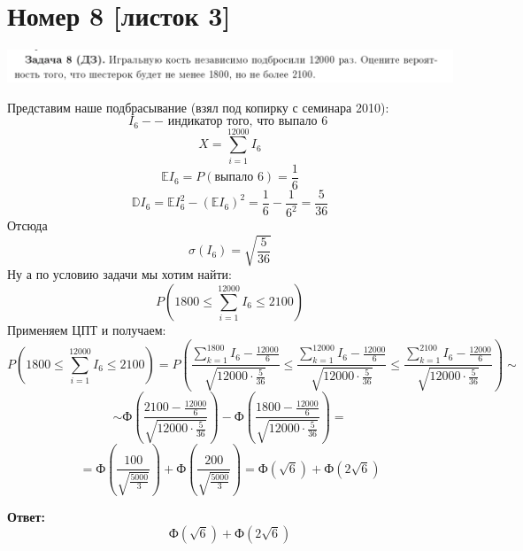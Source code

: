 \documentclass[a4paper,12pt]{article}
\begin{document}
\section*{Номер 8 [листок 3]}
\begin{center}
\includegraphics[scale=0.4]{3.png}
\end{center}
Представим наше подбрасывание (взял под копирку с семинара 2010):
\[
I_6 -- \text{ индикатор того, что выпало 6 }
\]
\[
X = \sum_{i = 1}^{12000} I_6
\]
\[
\mathbb{E}I_6 = P(\text{выпало 6}) = \frac{1}{6}
\]
\[ 
\mathbb{D}I_6 = \mathbb{E}I_6^2 - (\mathbb{E}I_6)^2 = \frac{1}{6} - \frac{1}{6^2} = \frac{5}{36}
\]
Отсюда
\[
\sigma(I_6) = \sqrt{\frac{5}{36}}
\]
Ну а по условию задачи мы хотим найти:
\[
P
\left(
1800 \leq  \sum_{i = 1}^{12000} I_6 \leq 2100
\right)
\]
Применяем ЦПТ и получаем:
\[
P
\left(
1800 \leq  \sum_{i = 1}^{12000} I_6 \leq 2100
\right) =
P 
\left(
\frac{\sum\limits_{k = 1}^{1800}I_6 - \frac{12000}{6}}{\sqrt{12000 \cdot \frac{5}{36}}} 
\leq
\frac{\sum\limits_{k = 1}^{12000}I_6 - \frac{12000}{6}}{\sqrt{12000 \cdot \frac{5}{36}}} 
\leq
\frac{\sum\limits_{k = 1}^{2100}I_6 - \frac{12000}{6}}{\sqrt{12000 \cdot \frac{5}{36}}} 
\right) \sim
\]
\[
\sim
 \text{Ф}
\left(
\frac{2100 - \frac{12000}{6}}{\sqrt{12000 \cdot \frac{5}{36}}} 
\right)
-
 \text{Ф}
\left(
\frac{1800 - \frac{12000}{6}}{\sqrt{12000 \cdot \frac{5}{36}}} 
\right) =
\]
\[
=
 \text{Ф}
\left(
\frac{100}{\sqrt{\frac{5000}{3}}}
\right)
+
 \text{Ф}
\left(
\frac{200}{\sqrt{\frac{5000}{3}}}
\right)
=
\text{Ф}(\sqrt{6}) + \text{Ф}(2 \sqrt{6})
\]
\begin{center}
\textbf{Ответ: } 
\[
\text{Ф}(\sqrt{6}) + \text{Ф}(2 \sqrt{6})
\]
\end{center}
\clearpage
\end{document}
